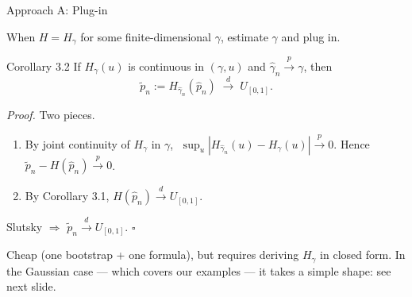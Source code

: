 \documentclass[10pt,aspectratio=169]{beamer}
\theoremstyle{plain}
\newcommand{\dto}{\xrightarrow{d}}
\newcommand{\pto}{\xrightarrow{p}}
\newcommand{\pnh}{\hat{p}_{n}}
\newcommand{\pnt}{\tilde{p}_{n}}
\begin{document}

\begin{frame}{Approach A: Plug-in}

  When $H = H_\gamma$ for some finite-dimensional $\gamma$, estimate $\gamma$
  and plug in.

  \medskip

  \begin{block}{Corollary 3.2}
    If $H_\gamma(u)$ is continuous in $(\gamma,u)$ and $\hat\gamma_n \pto \gamma$, then
    \[
      \pnt := H_{\hat\gamma_n}(\pnh) \;\dto\; U_{[0,1]}.
    \]
  \end{block}

  \medskip

  \textit{Proof.} Two pieces.
  \begin{enumerate}
    \setlength{\itemsep}{4pt}
    \item By joint continuity of $H_\gamma$ in $\gamma$,
      $\;\sup_u |H_{\hat\gamma_n}(u) - H_\gamma(u)| \pto 0$.
      Hence $\pnt - H(\pnh) \pto 0$.
    \item By Corollary 3.1, $H(\pnh) \dto U_{[0,1]}$.
  \end{enumerate}
  Slutsky $\Rightarrow$ $\pnt \dto U_{[0,1]}$. \;$\square$

  \medskip

  \footnotesize
  Cheap (one bootstrap + one formula), but requires deriving $H_\gamma$ in
  closed form. In the Gaussian case --- which covers our examples --- it
  takes a simple shape: see next slide.

\end{frame}

\end{document}
